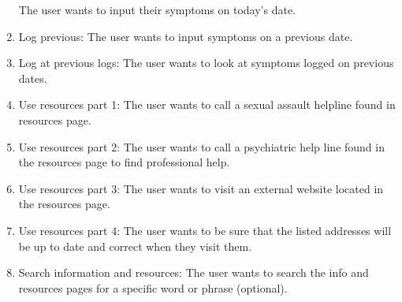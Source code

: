 \documentclass[letterpaper,12pt,titlepage]{article}
\begin{document}
\begin{enumerate}
The user wants to input their symptoms on today’s date.
\item Log previous:
\newline
The user wants to input symptoms on a previous date.
\item Log at previous logs:
\newline
The user wants to look at symptoms logged on previous dates.
\item Use resources part 1:
\newline
The user wants to call a sexual assault helpline found in resources page.
\item Use resources part 2:
\newline
The user wants to call a psychiatric help line found in the resources page to find professional help.
\item Use resources part 3:
\newline
The user wants to visit an external website located in the resources page.
\item Use resources part 4:
\newline
The user wants to be sure that the listed addresses will be up to date and correct when they visit them. 
\item Search information and resources:
\newline
The user wants to search the info and resources pages for a specific word or phrase (optional).
\end{enumerate}


\newpage
\end{document}
